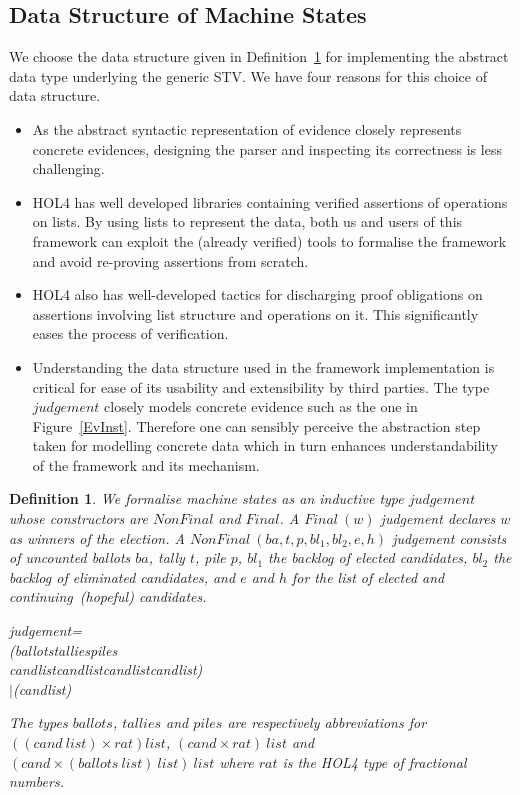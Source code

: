 \documentclass[10pt,conference]{IEEEtran}
\renewcommand{\HOLConst}[1]{{\textsf{\upshape #1}}}
\renewcommand{\HOLTyOp}[1]{\textsf{\itshape #1}}
\renewcommand{\HOLTokenBar}{\ensuremath{\mathtt{|}}}
\newtheorem{definition}{Definition}
\begin{document}
\subsection{Data Structure of Machine States}
\label{MachineData}
 We choose the data structure  given in Definition~\ref{judgement} for implementing the abstract data type underlying the generic STV.  We have four reasons for this choice of data structure. 
 \begin{itemize}
\item As the abstract syntactic representation of evidence closely represents concrete evidences, designing the parser and inspecting  its  correctness is less challenging.  
 \item HOL4 has well developed libraries containing verified
 assertions of operations on lists. By using lists to represent the
 data, both us and users of this framework can 
exploit the (already
 verified) tools to formalise the framework and avoid re-proving
 assertions from scratch.
 \item HOL4 also has well-developed
 tactics for discharging proof obligations on assertions involving
 list structure and operations on it. This significantly eases the
 process of verification. 
 \item Understanding the data structure used in the  framework implementation is critical for ease of  its usability and extensibility by third parties.  The type $\mathit{judgement}$ closely models concrete evidence such as the one in Figure~\ref{EvInst}. Therefore one can sensibly perceive the  abstraction step taken for modelling  concrete data which in turn enhances understandability of the framework and its mechanism. 
   \end{itemize}
\begin{definition}\label{judgement}
We formalise machine states as an inductive type  $\mathit{judgement}$ whose constructors are  $\mathit{NonFinal}$ and $\mathit{Final}$. 
 A $\mathit{Final~(w)}$ judgement declares $w$ as winners of the election. A  $\mathit{NonFinal~(ba,t,p,bl_{1},bl_{2},e,h)}$ judgement  consists of uncounted ballots $ba$, tally $t$, pile $p$, $bl_{1}$ the backlog of elected candidates, $bl_{2}$ the backlog of eliminated candidates, and $e$ and $h$ for the list of elected and continuing~(hopeful) candidates. 
\begin{holthmenv}
\HOLTyOp{judgement}\;=\\
\;\;\;\;\HOLConst{NonFinal}\;(\HOLTyOp{ballots}\;\HOLTokenProd{}\;\HOLTyOp{tallies}\;\HOLTokenProd{}\;\HOLTyOp{piles}\;\HOLTokenProd{}\\\;\;\;\;\;\;\HOLTyOp{cand}\;\HOLTyOp{list}\;\HOLTokenProd{}\;\HOLTyOp{cand}\;\HOLTyOp{list}\;\HOLTokenProd{}\;\HOLTyOp{cand}\;\HOLTyOp{list}\;\HOLTokenProd{}\;\HOLTyOp{cand}\;\HOLTyOp{list})\\
\;\;\HOLTokenBar{}\;\HOLConst{Final}\;(\HOLTyOp{cand}\;\HOLTyOp{list})
\end{holthmenv} 
 The types  $\mathit{ballots}$, $\mathit{tallies}$ and $\mathit{piles}$ are respectively abbreviations for  $\mathit{((cand ~list)\times rat) list}$,   $\mathit{(cand\times rat)~list}$ and $\mathit{(cand\times(ballots~list)~list) ~list}$ where $\mathit{rat}$ is the HOL4 type of fractional numbers.
\end{definition}
\end{document}

